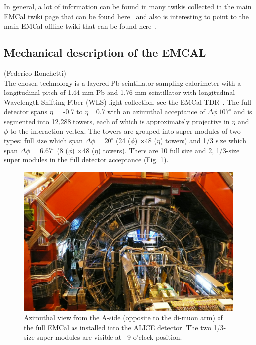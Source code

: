 In general, a lot of information can be found in many twikis collected in the main EMCal twiki page that can be found here~\cite{EMCAL:MainTwiki} and also is interesting to point to the main EMCal offline twiki that can be found here~\cite{EMCAL:OffTwiki}.

\subsection{Mechanical description of the EMCAL}
(Federico Ronchetti)\\

The chosen technology is a layered Pb-scintillator sampling calorimeter with a longitudinal pitch of 1.44 mm Pb and 1.76 mm scintillator with longitudinal 
Wavelength Shifting Fiber (WLS) light collection, see the EMCal TDR~\cite{EMCalTDR}. The full detector spans $\eta$ = -0.7 to $\eta$= 0.7 with an azimuthal acceptance of $\Delta\phi~107^\circ$ 
and is segmented into 12,288 towers, each of which is approximately projective in $\eta$ and $\phi$ to the interaction vertex. 
The towers are grouped into super modules of two types: full size which span $\Delta\phi=20^\circ$ (24 ($\phi$) $\times$48 ($\eta$) towers) and 1/3 size which span $\Delta\phi$ = 6.67$^\circ$  (8 ($\phi$) $\times$48 ($\eta$) towers). 
There are 10 full size and 2, 1/3-size super modules in the full detector acceptance (Fig. \ref{fig:emcal-full}). \\

\begin{figure}[ht]
\begin{center}
\includegraphics[width=1.0\textwidth]{figures/emcal-full.pdf}
\end{center}
\caption{\label{fig:emcal-full} Azimuthal view from the A-side (opposite to the di-muon arm) of the full EMCal as installed into the ALICE detector.
The two 1/3-size super-modules are visible at ~9 o'clock position.}
\end{figure}


